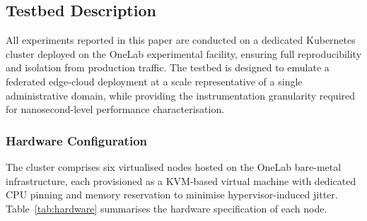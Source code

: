 \subsection{Testbed Description}
\label{subsec:testbed}

All experiments reported in this paper are conducted on a dedicated
Kubernetes cluster deployed on the OneLab experimental facility,
ensuring full reproducibility and isolation from production traffic.
The testbed is designed to emulate a federated edge-cloud deployment
at a scale representative of a single administrative domain, while
providing the instrumentation granularity required for nanosecond-level
performance characterisation.

\subsubsection{Hardware Configuration}
\label{subsubsec:hardware}

The cluster comprises six virtualised nodes hosted on the OneLab
bare-metal infrastructure, each provisioned as a KVM-based virtual
machine with dedicated CPU pinning and memory reservation to minimise
hypervisor-induced jitter.
Table~\ref{tab:hardware} summarises the hardware specification of
each node.

\begin{table}[htbp]
  \centering
  \caption{Testbed node hardware specifications.}
  \label{tab:hardware}
\end{table}

